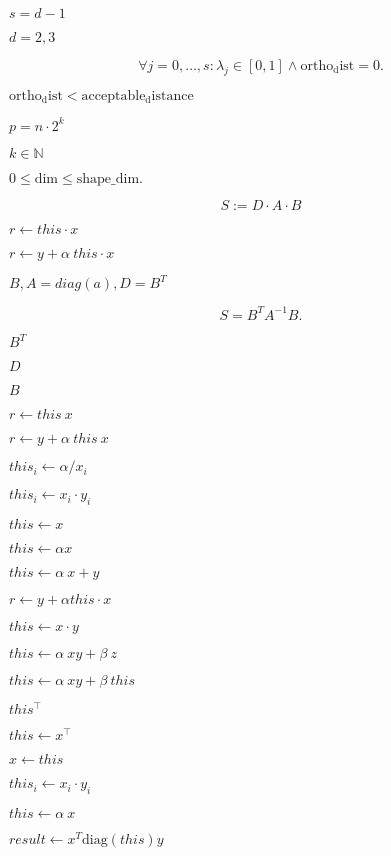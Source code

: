 \documentclass{article}
\begin{document}
$ s = d-1 $
\pagebreak

$ d = 2, 3 $
\pagebreak

\[
    \forall j=0, \dots, s: \lambda_j \in [0, 1] \wedge\mathrm{ortho_dist} = 0.
  \]
\pagebreak

$ \mathrm{ortho_dist} <
  \mathrm{acceptable_distance} $
\pagebreak

$p = n\cdot2^k$
\pagebreak

$k\in\mathbb{N}$
\pagebreak

$ 0 \leq \mathrm{dim} \leq \mathrm{shape\_dim}.$
\pagebreak

\[S := D\cdot A\cdot B\]
\pagebreak

$ r \leftarrow this\cdot x $
\pagebreak

$ r \leftarrow y + \alpha~ this\cdot x $
\pagebreak

$ B, A = diag(a), D = B^T $
\pagebreak

\[ S = B^T A^{-1} B. \]
\pagebreak

$ B^T $
\pagebreak

$ D $
\pagebreak

$ B $
\pagebreak

$ r \leftarrow this~ x $
\pagebreak

$ r \leftarrow y + \alpha~ this~ x $
\pagebreak

$ this_i \leftarrow \alpha / x_i $
\pagebreak

$ this_i \leftarrow x_i \cdot y_i $
\pagebreak

$this \leftarrow x$
\pagebreak

$this \leftarrow \alpha x $
\pagebreak

$this \leftarrow \alpha~ x + y$
\pagebreak

$ r \leftarrow y + \alpha this\cdot x $
\pagebreak

$ this \leftarrow x \cdot y $
\pagebreak

$this \leftarrow \alpha~ x y + \beta~ z$
\pagebreak

$this \leftarrow \alpha~ x y + \beta~ this$
\pagebreak

$this^\top $
\pagebreak

$this \leftarrow x^\top $
\pagebreak

$x \leftarrow this$
\pagebreak

$this_i \leftarrow x_i \cdot y_i$
\pagebreak

$this \leftarrow \alpha~ x $
\pagebreak

$result \leftarrow x^T \mathrm{diag}(this) y $
\pagebreak
\end{document}
